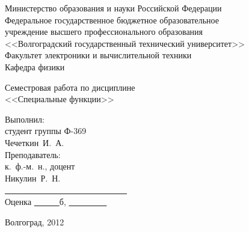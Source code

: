 \documentclass[a4paper, 14pt]{extarticle}
\begin{document}
\begin{titlepage}
    \singlespacing
    \newpage
    \begin{center}
        Министерство образования и науки Российской Федерации \\
        Федеральное государственное бюджетное образовательное \\
        учреждение высшего профессионального образования \\
        <<Волгоградский государственный технический университет>> \\
        Факультет электроники и вычислительной техники \\
        Кафедра физики
    \end{center}

    \vspace{14em}

    \begin{center}
        \large Семестровая работа по дисциплине
        \\ <<Специальные функции>>
    \end{center}

    \vspace{5em}

    \begin{flushright}
        \begin{minipage}{.3\textwidth}
            Выполнил:\\студент группы Ф-369\\Чечеткин~И.~А.
            \vspace{1em}\\        
            Преподаватель:\\к.~ф.-м.~н., доцент\\Никулин~Р.~Н.
            \\ \underline{\ \ \ \ \ \ \ \ \ \ \ \ \ \ \ \ \ \ \ \ \ \ \ \ \ \ \ 
            \ \ }
            \\ Оценка \underline{\ \ \ \ \ \ }б, \underline{\ \ \ \ \ \ \ \ \ }
        \end{minipage}
    \end{flushright}

    \vspace{\fill}

    \begin{center}
        Волгоград, 2012
    \end{center}

\end{titlepage}
\setcounter{page}{2}
\end{document}
